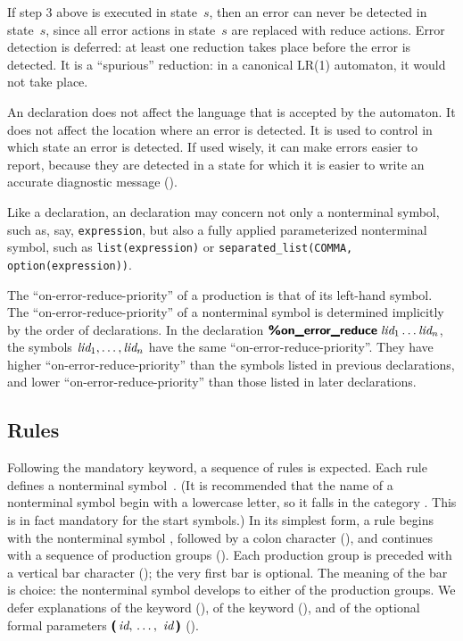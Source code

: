 \documentclass[onecolumn,11pt,nocopyrightspace,preprint]{sigplanconf}
\begin{document}
If step 3 above is executed in state~$s$, then an error can never be detected
in state~$s$, since all error actions in state~$s$ are replaced with reduce
actions. Error detection is deferred: at least one reduction takes place
before the error is detected. It is a ``spurious'' reduction: in a canonical
LR(1) automaton, it would not take place.

An \donerrorreduce declaration does not affect the language that is accepted
by the automaton. It does not affect the location where an error is detected.
It is used to control in which state an error is detected. If used wisely, it
can make errors easier to report, because they are detected in a state for
which it is easier to write an accurate diagnostic message
().


Like a \dtype declaration, an \donerrorreduce declaration may concern not only
a nonterminal symbol, such as, say, \texttt{expression}, but also a fully
applied parameterized nonterminal symbol, such as \texttt{list(expression)} or
\texttt{separated\_list(COMMA, option(expression))}.

The ``on-error-reduce-priority'' of a production is that of its left-hand
symbol. The ``on-error-reduce-priority'' of a nonterminal symbol is determined
implicitly by the order of \donerrorreduce declarations. In the declaration
$\text{\upshape\sf\bfseries \%on\_error\_reduce}\;\textit{lid}_1 \ldots \textit{lid}_n$, the symbols $\textit{lid}_1, \ldots,
\textit{lid}_n$ have the same ``on-error-reduce-priority''. They have higher
``on-error-reduce-priority'' than the symbols listed in previous
\donerrorreduce declarations, and lower ``on-error-reduce-priority''
than those listed in later \donerrorreduce declarations.

\subsection{Rules}

Following the mandatory \percentpercent keyword, a sequence of rules is
expected. Each rule defines a nonterminal symbol~.
%
(It is recommended that the name of a nonterminal symbol begin with a lowercase
letter, so it falls in the category . This is in fact mandatory for the
start symbols.)
In its simplest
form, a rule begins with the nonterminal symbol ,
followed by a colon character (\deuxpoints),
and continues with a sequence of production groups
(). Each production group is preceded with a
vertical bar character (\barre); the very first bar is optional. The meaning
of the bar is choice: the nonterminal symbol  develops to either of the
production groups. We defer explanations of the keyword \dpublic
(), of the keyword \dinline (), and of the
optional formal parameters $\dlpar\sepcommalist{\nt{id}}\drpar$
().
\end{document}
